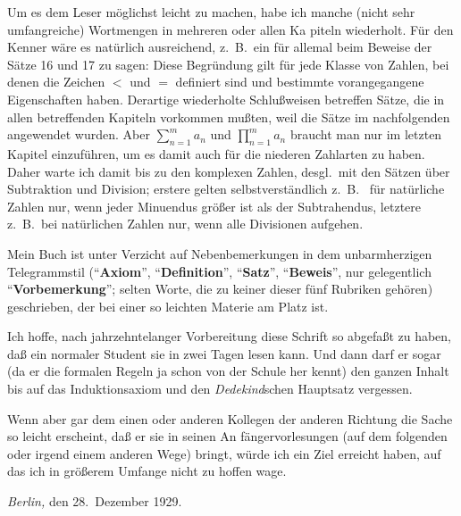 Um es dem Leser m\"oglichst leicht zu machen, habe ich manche
(nicht sehr umfangreiche) Wortmengen in mehreren oder allen Ka%
piteln wiederholt.  F\"ur den Kenner w\"are es nat\"urlich ausreichend,
z.~B.\ ein f\"ur allemal beim Beweise der S\"atze 16 und 17 zu sagen:
Diese Begr\"undung gilt f\"ur jede Klasse von Zahlen, bei denen die
Zeichen $<$ und $=$ definiert sind und bestimmte vorangegangene
Eigenschaften haben.  Derartige wiederholte Schlu{\ss}weisen betreffen
S\"atze, die in allen betreffenden Kapiteln vorkommen mu{\ss}ten, weil
die S\"atze im nachfolgenden angewendet wurden.  Aber $\sum_{n = 1}^m a_n$ und
$\prod_{n = 1}^m a_n$ braucht man nur im letzten Kapitel einzuf\"uhren, um es
damit auch f\"ur die niederen Zahlarten zu haben.  Daher warte ich
damit bis zu den komplexen Zahlen, desgl.\ mit den S\"atzen \"uber
Subtraktion und Division; erstere gelten selbstverst\"andlich z.~B.\ %
f\"ur nat\"urliche Zahlen nur, wenn jeder Minuendus gr\"o{\ss}er ist als
der Subtrahendus, letztere z.~B.\ bei nat\"urlichen Zahlen nur, wenn
alle Divisionen aufgehen.

Mein Buch ist unter Verzicht auf Nebenbemerkungen in dem
unbarmherzigen Telegrammstil (``{\bf Axiom}'', ``{\bf Definition}'', ``{\bf Satz}'',
``{\bf Beweis}'', nur gelegentlich ``{\bf Vorbemerkung}''; selten Worte, die
zu keiner dieser f\"unf Rubriken geh\"oren) geschrieben, der bei einer
so leichten Materie am Platz ist.

Ich hoffe, nach jahrzehntelanger Vorbereitung diese Schrift so
abgefa{\ss}t zu haben, da{\ss} ein normaler Student sie in zwei Tagen
lesen kann.  Und dann darf er sogar (da er die formalen Regeln
ja schon von der Schule her kennt) den ganzen Inhalt bis auf das
Induktionsaxiom und den {\sl Dedekind\/}schen Hauptsatz vergessen.

Wenn aber gar dem einen oder anderen Kollegen der anderen
Richtung die Sache so leicht erscheint, da{\ss} er sie in seinen An%
f\"angervorlesungen (auf dem folgenden oder irgend einem anderen
Wege) bringt, w\"urde ich ein Ziel erreicht haben, auf das ich in
gr\"o{\ss}erem Umfange nicht zu hoffen wage.
\bigskip

{\sl Berlin,} den 28.~Dezember 1929.
\bigskip

\vfill\eject


